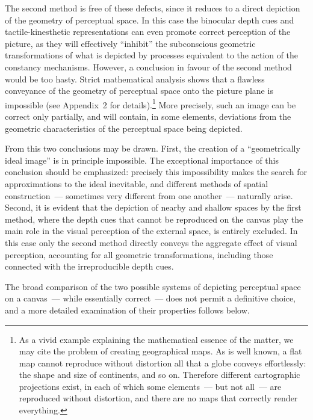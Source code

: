 The second method is free of these defects, since it reduces to a direct depiction of the
geometry of perceptual space.  In this case the binocular depth cues and
tactile-kinesthetic representations can even promote correct perception of the picture,
as they will effectively ``inhibit'' the subconscious geometric transformations of what is
depicted by processes equivalent to the action of the constancy mechanisms.  However,
a conclusion in favour of the second method would be too hasty.  Strict mathematical
analysis shows that a flawless conveyance of the geometry of perceptual space onto the
picture plane is impossible (see Appendix~2 for details).\footnote{%
  As a vivid example explaining the mathematical essence of the matter, we may cite
  the problem of creating geographical maps.  As is well known, a flat map cannot
  reproduce without distortion all that a globe conveys effortlessly: the shape and size
  of continents, and so on.  Therefore different cartographic projections exist, in each
  of which some elements~--- but not all~--- are reproduced without distortion, and
  there are no maps that correctly render everything.}
  More precisely, such an image can be correct only partially, and will contain, in
some elements, deviations from the geometric characteristics of the perceptual space
being depicted.

From this two conclusions may be drawn.  First, the creation of a ``geometrically ideal
image'' is in principle impossible.  The exceptional importance of this conclusion should
be emphasized: precisely this impossibility makes the search for approximations to the
ideal inevitable, and different methods of spatial construction~--- sometimes very
different from one another~--- naturally arise.  Second, it is evident that the depiction of
nearby and shallow spaces by the first method, where the depth cues that cannot be
reproduced on the canvas play the main role in the visual perception of the external
space, is entirely excluded.  In this case only the second method directly conveys the
aggregate effect of visual perception, accounting for all geometric transformations,
including those connected with the irreproducible depth cues.


The broad comparison of the two possible systems of depicting perceptual space on a
canvas~--- while essentially correct~--- does not permit a definitive choice, and a more
detailed examination of their properties follows below.

